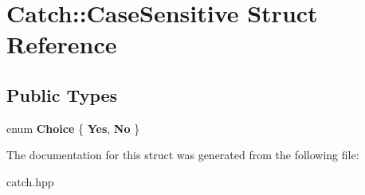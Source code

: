 \hypertarget{struct_catch_1_1_case_sensitive}{}\section{Catch\+:\+:Case\+Sensitive Struct Reference}
\label{struct_catch_1_1_case_sensitive}
\subsection*{Public Types}
\begin{DoxyCompactItemize}
\item 
\mbox{\label{struct_catch_1_1_case_sensitive_aad49d3aee2d97066642fffa919685c6a}} 
enum {\bfseries Choice} \{ {\bfseries Yes}, 
{\bfseries No}
 \}
\end{DoxyCompactItemize}


The documentation for this struct was generated from the following file\+:\begin{DoxyCompactItemize}
\item 
catch.\+hpp\end{DoxyCompactItemize}
